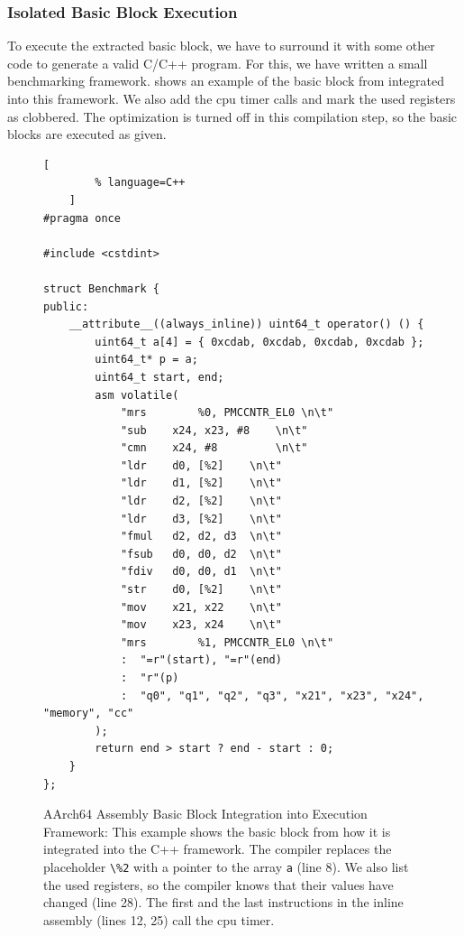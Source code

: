 \subsubsection{Isolated Basic Block Execution}
\label{sec:approach:isol_bb_exec}
To execute the extracted basic block, we have to surround it with some other code to generate a valid C/C++ program.
For this, we have written a small benchmarking framework.
 shows an example of the basic block from  integrated into this framework.
We also add the \ac{cpu} timer calls and mark the used registers as clobbered.
The optimization is turned off in this compilation step, so the basic blocks are executed as given.
\begin{figure}
    \begin{lstlisting}[
        % language=C++
    ]
#pragma once

#include <cstdint>

struct Benchmark {
public:
    __attribute__((always_inline)) uint64_t operator() () {
        uint64_t a[4] = { 0xcdab, 0xcdab, 0xcdab, 0xcdab };
        uint64_t* p = a;
        uint64_t start, end;
        asm volatile(
            "mrs        %0, PMCCNTR_EL0 \n\t"
            "sub	x24, x23, #8	\n\t"
            "cmn	x24, #8         \n\t"
            "ldr	d0, [%2]	\n\t"
            "ldr	d1, [%2]	\n\t"
            "ldr	d2, [%2]	\n\t"
            "ldr	d3, [%2]	\n\t"
            "fmul	d2, d2, d3	\n\t"
            "fsub	d0, d0, d2	\n\t"
            "fdiv	d0, d0, d1	\n\t"
            "str	d0, [%2]	\n\t"
            "mov	x21, x22	\n\t"
            "mov	x23, x24	\n\t"
            "mrs        %1, PMCCNTR_EL0 \n\t"
            :  "=r"(start), "=r"(end)
            :  "r"(p)
            :  "q0", "q1", "q2", "q3", "x21", "x23", "x24",  "memory", "cc"
        );
        return end > start ? end - start : 0;
    }
};        
    \end{lstlisting}
    \caption[Assembly Basic Block Integration into Execution Framework]{AArch64 Assembly Basic Block Integration into Execution Framework:
    This example shows the basic block from  how it is integrated into the C++ framework.
    The compiler replaces the placeholder \lstinline|\%2| with a pointer to the array \lstinline|a| (line 8).
    We also list the used registers, so the compiler knows that their values have changed (line 28).
    The first and the last instructions in the inline assembly (lines 12, 25) call the \ac{cpu} timer.}
    \label{fig:approach:bb-executable}
\end{figure}

